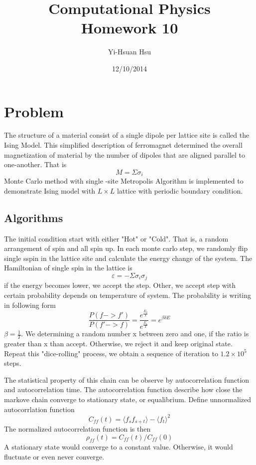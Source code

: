 \documentclass[12pt]{article}
\begin{document}
\title{Computational Physics \\ Homework 10}
\author{Yi-Hsuan Hsu}
\date{12/10/2014}
\maketitle

\section{Problem}
The structure of a material consist of a single dipole per lattice site is called the Ising Model. This simplified description of ferromagnet determined the overall magnetization of material by the number of dipoles that are aligned parallel to one-another. That is
\begin{equation}
	M = \Sigma \sigma_i
\end{equation}
Monte Carlo method with single -site Metropolis Algorithm is implemented to demonstrate Ising model with $L \times L$ lattice with periodic boundary condition.

\subsection{Algorithms}
The initial condition start with either "Hot" or "Cold". That is, a random arrangement of spin and all spin up. In each monte carlo step, we randomly flip single sspin in the lattice site and calculate the energy change of the system. The Hamiltonian of single spin in the lattice is
\begin{equation}
	\varepsilon=-\Sigma \sigma_i\sigma_j
\end{equation}
if the energy becomes lower, we accept the step. Other, we accept step with certain probability depends on temperature of system. The probability is writing in following form
\begin{equation}
	\frac{P(f->f')}{P(f'->f)}=\frac{e^{\frac{E_2}{T}}}{e^{\frac{E_1}{T}}}=e^{\beta\delta E}
\end{equation}
$\beta=\frac{1}{T}$. We determining a random number x between zero and one, if the ratio is greater than x than accept. Otherwise, we reject it and keep original state. Repeat this "dice-rolling" process, we obtain a sequence of iteration to $1.2 \times 10^5$steps. 

The statistical property of this chain can be observe by autocorrelation function and autocorrelation time. The autocorrelation function describe how close the markove chain converge to stationary state, or equalibrium. Define unnormalized autocorrlation function 
\begin{equation}
	C_{ff}(t)=\langle f_s f_{s+t}\rangle- \langle f_t \rangle^2
\end{equation}
The normalized autocorrelation function is then
\begin{equation}
	\rho_{ff}(t)=C_{ff}(t)/C_{ff}(0)
\end{equation}
A stationary state would converge to a constant value. Otherwise, it would fluctuate or even never converge.
\end{document}
